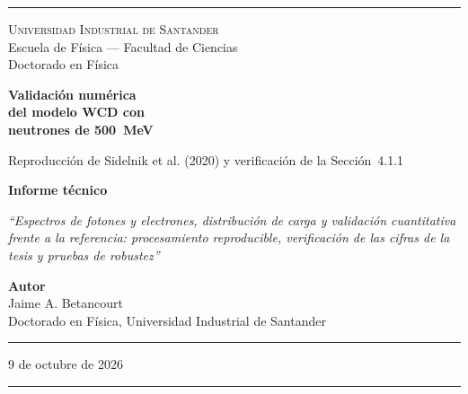 \documentclass[11pt,a4paper]{article}
\begin{document}
\pagestyle{empty}

\begin{titlepage}
\begin{center}
\vspace*{0.5cm}
\textcolor{reglaColor}{\rule{\linewidth}{1.2pt}}

\vspace{1.3cm}
{\Large\scshape Universidad Industrial de Santander}\\[0.2cm]
{\large Escuela de Física --- Facultad de Ciencias}\\[0.2cm]
{\large Doctorado en Física}

\vspace{2.2cm}
{\Huge\bfseries\color{tituloColor} Validación numérica\\[0.3cm] del modelo WCD con\\[0.3cm] neutrones de 500~MeV}

\vspace{1.2cm}
{\Large Reproducción de Sidelnik et al. (2020) y verificación de la Sección~4.1.1}

\vspace{1.4cm}
{\large\textbf{Informe técnico}}

\vspace{0.6cm}
\begin{minipage}{0.82\linewidth}
\centering
\textit{``Espectros de fotones y electrones, distribución de carga y validación cuantitativa frente a la referencia: procesamiento reproducible, verificación de las cifras de la tesis y pruebas de robustez''}
\end{minipage}

\vfill
{\large\textbf{Autor}}\\[0.15cm]
Jaime A. Betancourt\\[0.1cm]
Doctorado en Física, Universidad Industrial de Santander

\vspace{1.2cm}
\textcolor{reglaColor}{\rule{0.5\linewidth}{0.6pt}}

\vspace{1cm}
9 de octubre de 2026

\vspace{1cm}
\textcolor{reglaColor}{\rule{\linewidth}{1.2pt}}
\end{center}
\end{titlepage}

\pagestyle{plain}
\end{document}

